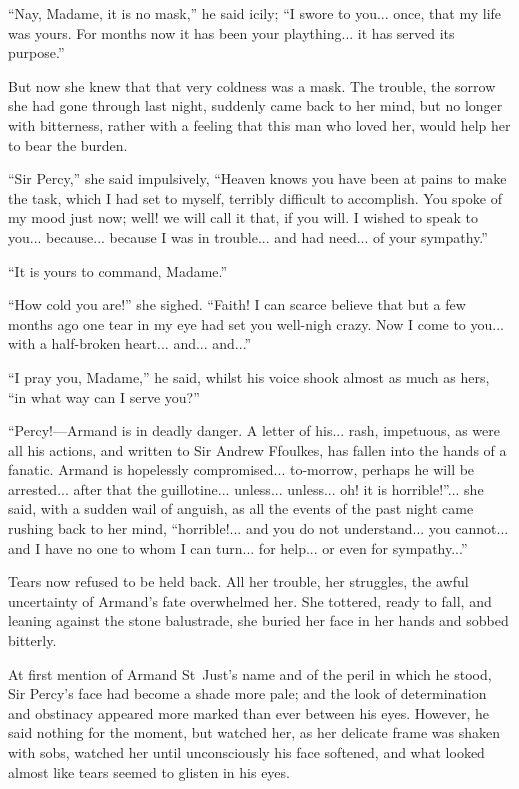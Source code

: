\enquote{Nay, Madame, it is no mask,} he said icily; \enquote{I swore to you... once, that my life was yours. For months now it has been your plaything... it has served its purpose.}

But now she knew that that very coldness was a mask. The trouble, the sorrow she had gone through last night, suddenly came back to her mind, but no longer with bitterness, rather with a feeling that this man who loved her, would help her to bear the burden.

\enquote{Sir Percy,} she said impulsively, \enquote{Heaven knows you have been at pains to make the task, which I had set to myself, terribly difficult to accomplish. You spoke of my mood just now; well! we will call it that, if you will. I wished to speak to you... because... because I was in trouble... and had need... of your sympathy.}

\enquote{It is yours to command, Madame.}

\enquote{How cold you are!} she sighed. \enquote{Faith! I can scarce believe that but a few months ago one tear in my eye had set you well-nigh crazy. Now I come to you... with a half-broken heart... and... and...}

\enquote{I pray you, Madame,} he said, whilst his voice shook almost as much as hers, \enquote{in what way can I serve you?}

\enquote{Percy!---Armand is in deadly danger. A letter of his... rash, impetuous, as were all his actions, and written to Sir Andrew Ffoulkes, has fallen into the hands of a fanatic. Armand is hopelessly compromised... to-morrow, perhaps he will be arrested... after that the guillotine... unless... unless... oh! it is horrible!}... she said, with a sudden wail of anguish, as all the events of the past night came rushing back to her mind, \enquote{horrible!... and you do not understand... you cannot... and I have no one to whom I can turn... for help... or even for sympathy...}

Tears now refused to be held back. All her trouble, her struggles, the awful uncertainty of Armand's fate overwhelmed her. She tottered, ready to fall, and leaning against the stone balustrade, she buried her face in her hands and sobbed bitterly.

At first mention of Armand St~Just's name and of the peril in which he stood, Sir Percy's face had become a shade more pale; and the look of determination and obstinacy appeared more marked than ever between his eyes. However, he said nothing for the moment, but watched her, as her delicate frame was shaken with sobs, watched her until unconsciously his face softened, and what looked almost like tears seemed to glisten in his eyes.

